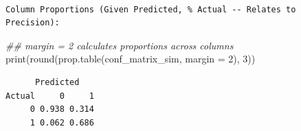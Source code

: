 \documentclass[
  letterpaper,
]{scrbook}
\newenvironment{Shaded}{\begin{snugshade}}{\end{snugshade}}
\newcommand{\AttributeTok}[1]{\textcolor[rgb]{0.40,0.45,0.13}{#1}}
\newcommand{\DecValTok}[1]{\textcolor[rgb]{0.68,0.00,0.00}{#1}}
\newcommand{\DocumentationTok}[1]{\textcolor[rgb]{0.37,0.37,0.37}{\textit{#1}}}
\newcommand{\FunctionTok}[1]{\textcolor[rgb]{0.28,0.35,0.67}{#1}}
\newcommand{\NormalTok}[1]{\textcolor[rgb]{0.00,0.23,0.31}{#1}}
\begin{document}
\begin{verbatim}

Column Proportions (Given Predicted, % Actual -- Relates to Precision):
\end{verbatim}

\begin{Shaded}
\begin{Highlighting}[]
\DocumentationTok{\#\# margin = 2 calculates proportions across columns}
\FunctionTok{print}\NormalTok{(}\FunctionTok{round}\NormalTok{(}\FunctionTok{prop.table}\NormalTok{(conf\_matrix\_sim, }\AttributeTok{margin =} \DecValTok{2}\NormalTok{), }\DecValTok{3}\NormalTok{))}
\end{Highlighting}
\end{Shaded}

\begin{verbatim}
      Predicted
Actual     0     1
     0 0.938 0.314
     1 0.062 0.686
\end{verbatim}
\end{document}

